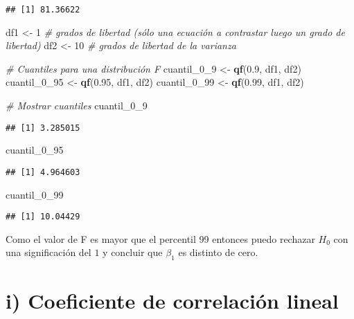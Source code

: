 \documentclass[
]{article}
\newenvironment{Shaded}{\begin{snugshade}}{\end{snugshade}}
\newcommand{\CommentTok}[1]{\textcolor[rgb]{0.56,0.35,0.01}{\textit{#1}}}
\newcommand{\DecValTok}[1]{\textcolor[rgb]{0.00,0.00,0.81}{#1}}
\newcommand{\FloatTok}[1]{\textcolor[rgb]{0.00,0.00,0.81}{#1}}
\newcommand{\FunctionTok}[1]{\textcolor[rgb]{0.13,0.29,0.53}{\textbf{#1}}}
\newcommand{\NormalTok}[1]{#1}
\newcommand{\OtherTok}[1]{\textcolor[rgb]{0.56,0.35,0.01}{#1}}
\begin{document}
\begin{verbatim}
## [1] 81.36622
\end{verbatim}

\begin{Shaded}
\begin{Highlighting}[]
\NormalTok{df1 }\OtherTok{\textless{}{-}} \DecValTok{1} \CommentTok{\# grados de libertad (sólo una ecuación a contrastar luego un grado de libertad)}
\NormalTok{df2 }\OtherTok{\textless{}{-}} \DecValTok{10} \CommentTok{\# grados de libertad de la varianza}

\CommentTok{\# Cuantiles para una distribución F}
\NormalTok{cuantil\_0\_9 }\OtherTok{\textless{}{-}} \FunctionTok{qf}\NormalTok{(}\FloatTok{0.9}\NormalTok{, df1, df2)}
\NormalTok{cuantil\_0\_95 }\OtherTok{\textless{}{-}} \FunctionTok{qf}\NormalTok{(}\FloatTok{0.95}\NormalTok{, df1, df2)}
\NormalTok{cuantil\_0\_99 }\OtherTok{\textless{}{-}} \FunctionTok{qf}\NormalTok{(}\FloatTok{0.99}\NormalTok{, df1, df2)}

\CommentTok{\# Mostrar cuantiles}
\NormalTok{cuantil\_0\_9}
\end{Highlighting}
\end{Shaded}

\begin{verbatim}
## [1] 3.285015
\end{verbatim}

\begin{Shaded}
\begin{Highlighting}[]
\NormalTok{cuantil\_0\_95}
\end{Highlighting}
\end{Shaded}

\begin{verbatim}
## [1] 4.964603
\end{verbatim}

\begin{Shaded}
\begin{Highlighting}[]
\NormalTok{cuantil\_0\_99}
\end{Highlighting}
\end{Shaded}

\begin{verbatim}
## [1] 10.04429
\end{verbatim}

Como el valor de F es mayor que el percentil 99 entonces puedo rechazar
\(H_0\) con una significación del \(1%
\) y concluir que \(\beta_1\) es distinto de cero.

\hypertarget{i-coeficiente-de-correlaciuxf3n-lineal}{%
\section{i) Coeficiente de correlación
lineal}\label{i-coeficiente-de-correlaciuxf3n-lineal}}
\end{document}
